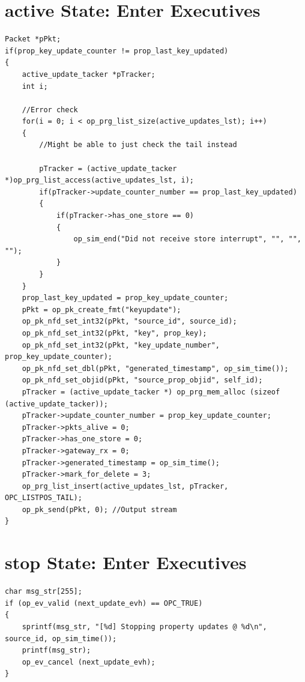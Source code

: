 \section{active State: Enter Executives}
{\tiny
\begin{verbatim}
Packet *pPkt;
if(prop_key_update_counter != prop_last_key_updated)
{
	active_update_tacker *pTracker;
	int i;
	
	//Error check
	for(i = 0; i < op_prg_list_size(active_updates_lst); i++)
	{
		//Might be able to just check the tail instead
	
		pTracker = (active_update_tacker *)op_prg_list_access(active_updates_lst, i);
		if(pTracker->update_counter_number == prop_last_key_updated)
		{
			if(pTracker->has_one_store == 0)
			{
				op_sim_end("Did not receive store interrupt", "", "", "");
			}
		}
	}
	prop_last_key_updated = prop_key_update_counter;
	pPkt = op_pk_create_fmt("keyupdate");
	op_pk_nfd_set_int32(pPkt, "source_id", source_id);		
	op_pk_nfd_set_int32(pPkt, "key", prop_key);	
	op_pk_nfd_set_int32(pPkt, "key_update_number", prop_key_update_counter);
	op_pk_nfd_set_dbl(pPkt, "generated_timestamp", op_sim_time());
	op_pk_nfd_set_objid(pPkt, "source_prop_objid", self_id);
	pTracker = (active_update_tacker *) op_prg_mem_alloc (sizeof (active_update_tacker));
	pTracker->update_counter_number = prop_key_update_counter;
	pTracker->pkts_alive = 0;
	pTracker->has_one_store = 0;
	pTracker->gateway_rx = 0;
	pTracker->generated_timestamp = op_sim_time();
	pTracker->mark_for_delete = 3;
	op_prg_list_insert(active_updates_lst, pTracker, OPC_LISTPOS_TAIL);	
	op_pk_send(pPkt, 0); //Output stream
}
\end{verbatim}
}

\section{stop State: Enter Executives}
{\tiny
\begin{verbatim}
char msg_str[255];
if (op_ev_valid (next_update_evh) == OPC_TRUE)
{
	sprintf(msg_str, "[%d] Stopping property updates @ %d\n", source_id, op_sim_time());
	printf(msg_str);
	op_ev_cancel (next_update_evh);
}
\end{verbatim}
}